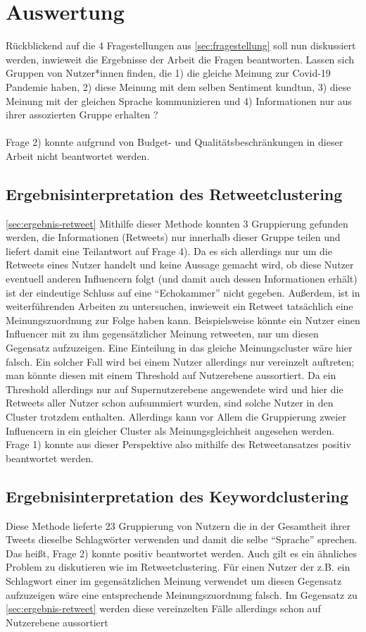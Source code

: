 \chapter{Auswertung}
\label{chap:auswertung}
Rückblickend auf die 4 Fragestellungen aus \ref{sec:fragestellung} soll nun diskussiert werden, inwieweit die Ergebnisse der Arbeit die Fragen beantworten. 
Lassen sich Gruppen von Nutzer*innen finden, die 1) die gleiche Meinung zur Covid-19 Pandemie haben, 2) diese Meinung mit dem selben Sentiment kundtun, 3) diese Meinung mit der gleichen Sprache kommunizieren und 4) Informationen nur aus ihrer assozierten Gruppe erhalten ? \\\\
Frage 2) konnte aufgrund von Budget- und Qualitätsbeschränkungen in dieser Arbeit nicht beantwortet werden.
\section{Ergebnisinterpretation des Retweetclustering}
\ref{sec:ergebnis-retweet}
Mithilfe dieser Methode konnten 3 Gruppierung gefunden  werden, die Informationen (Retweets) nur innerhalb dieser Gruppe teilen und liefert damit eine Teilantwort auf Frage 4). Da es sich allerdings nur um die Retweets eines Nutzer handelt  und keine Aussage gemacht wird, ob diese Nutzer eventuell anderen Influencern folgt (und damit auch dessen Informationen erhält) ist der eindeutige Schluss auf eine "`Echokammer"' nicht gegeben.
Außerdem, ist in weiterführenden Arbeiten zu untersuchen, inwieweit ein Retweet tatsächlich eine Meinungszuordnung zur Folge haben kann.
Beispielsweise könnte ein Nutzer einen Influencer mit zu ihm gegensätzlicher Meinung retweeten, nur um diesen Gegensatz aufzuzeigen. Eine Einteilung in das gleiche Meinungscluster wäre hier falsch.
Ein solcher Fall wird bei einem Nutzer allerdings nur vereinzelt auftreten; man könnte diesen mit einem Threshold auf Nutzerebene aussortiert. Da ein Threshold allerdings nur auf Supernutzerebene angewendete wird und hier die Retweets aller Nutzer schon aufsummiert wurden, sind solche Nutzer in den Cluster trotzdem enthalten. 
Allerdings kann vor Allem die Gruppierung zweier Influencern in ein gleicher Cluster als Meinungsgleichheit angesehen werden. Frage 1) konnte aus dieser Perspektive also mithilfe des Retweetansatzes positiv beantwortet werden.

\section{Ergebnisinterpretation des Keywordclustering}
Diese Methode lieferte 23 Gruppierung von Nutzern die in der Gesamtheit ihrer Tweets dieselbe Schlagwörter verwenden und damit die selbe "`Sprache"' sprechen. Das heißt, Frage 2) konnte positiv beantwortet werden. Auch gilt es  ein ähnliches Problem zu diskutieren wie im Retweetclustering.
Für einen Nutzer der z.B. ein Schlagwort einer im gegensätzlichen Meinung verwendet um diesen Gegensatz aufzuzeigen wäre eine entsprechende Meinungszuordnung falsch.
Im Gegensatz zu \ref{sec:ergebnis-retweet} werden diese vereinzelten Fälle allerdings schon auf Nutzerebene aussortiert
\label{sec:interpretation}